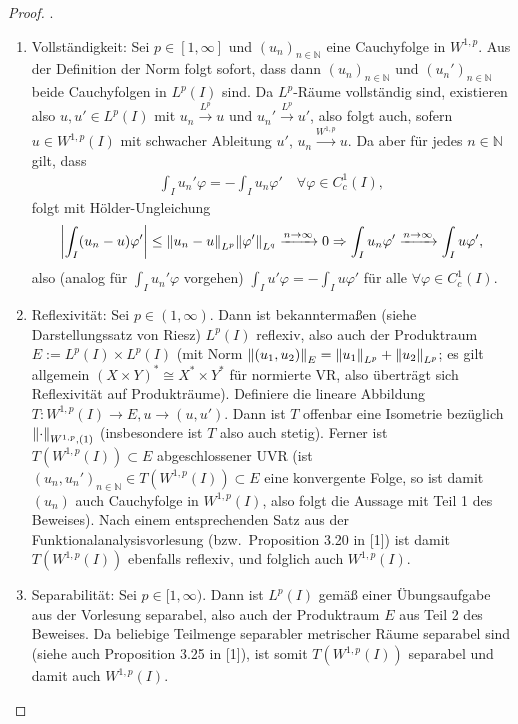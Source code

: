 \documentclass[twoside]{article}
\theoremstyle{definition}
\begin{document}
\begin{proof}.\\
\begin{enumerate}
\item Vollständigkeit: Sei $p \in [1,\infty]$ und $(u_n)_{n \in \mathbb{N}}$ eine Cauchyfolge in $W^{1,p}$. Aus der Definition der Norm folgt sofort, dass dann $(u_n)_{n \in \mathbb{N}}$ und $(u_n')_{n \in \mathbb{N}}$ beide Cauchyfolgen in $L^p(I)$ sind. Da $L^p$-Räume vollständig sind, existieren also $u,u' \in L^p(I)$ mit $u_n \xrightarrow{L^p} u$ und $u_n' \xrightarrow{L^p} u'$, also folgt auch, sofern $u \in W^{1,p}(I)$ mit schwacher Ableitung $u'$, $u_n \xrightarrow{W^{1,p}} u$. Da aber für jedes $n \in \mathbb{N}$ gilt, dass
\begin{align*}
\int_I u_n' \varphi = - \int_I u_n \varphi' \quad \forall \varphi \in C^1_c(I),
\end{align*}
folgt mit Hölder-Ungleichung
\begin{align*}
\abs{\int_I (u_n - u) \varphi'} \leq \norm{u_n-u}_{L^p} \norm{\varphi'}_{L^q} \xrightarrow{n \to \infty} 0 \Rightarrow \int_I u_n \varphi' \xrightarrow{n \to \infty} \int_I u \varphi',
\end{align*}
also (analog für $\int_I u_n' \varphi$ vorgehen) $\int_I u' \varphi = - \int_I u \varphi'$ für alle $\forall \varphi \in C^1_c(I)$.

\item Reflexivität: Sei $p \in (1,\infty)$. Dann ist bekanntermaßen (siehe Darstellungssatz von Riesz) $L^p(I)$ reflexiv, also auch der Produktraum $E := L^p(I) \times L^p(I)$ (mit Norm $\norm{(u_1,u_2)}_E = \norm{u_1}_{L^p} + \norm{u_2}_{L^p}$; es gilt allgemein $(X \times Y)^* \cong X^* \times Y^*$ für normierte VR, also überträgt sich Reflexivität auf Produkträume). Definiere die lineare Abbildung $T:W^{1,p}(I) \to E, u \to (u,u')$. Dann ist $T$ offenbar eine Isometrie bezüglich $\norm{\cdot}_{W^{1,p},(1)}$ (insbesondere ist $T$ also auch stetig). Ferner ist $T(W^{1,p}(I))\subset E$ abgeschlossener UVR (ist $(u_n,u_n')_{n \in \mathbb{N}} \in T(W^{1,p}(I))\subset E$ eine konvergente Folge, so ist damit $(u_n)$ auch Cauchyfolge in $W^{1,p}(I)$, also folgt die Aussage mit Teil 1 des Beweises). Nach einem entsprechenden Satz aus der Funktionalanalysisvorlesung (bzw.\ Proposition 3.20 in [1]) ist damit $T(W^{1,p}(I))$ ebenfalls reflexiv, und folglich auch $W^{1,p}(I)$.

\item Separabilität: Sei $p \in [1,\infty)$. Dann ist $L^p(I)$ gemäß einer Übungsaufgabe aus der Vorlesung separabel, also auch der Produktraum $E$ aus Teil 2 des Beweises. Da beliebige Teilmenge separabler metrischer Räume separabel sind (siehe auch Proposition 3.25 in [1]), ist somit $T(W^{1,p}(I))$ separabel und damit auch $W^{1,p}(I)$.
\end{enumerate}
\end{proof}
\end{document}
